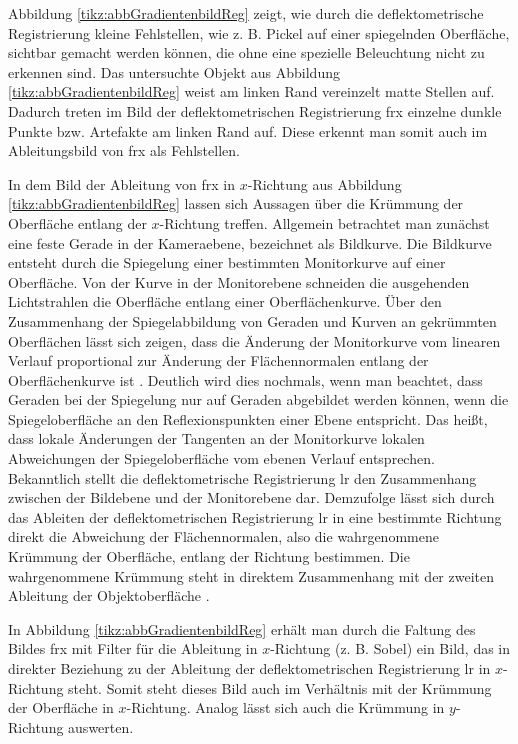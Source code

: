 \noindent
Abbildung \ref{tikz:abbGradientenbildReg} zeigt, wie durch die deflektometrische Registrierung kleine Fehlstellen, wie z. B. Pickel auf einer spiegelnden Oberfläche, sichtbar gemacht werden können, die ohne eine spezielle Beleuchtung nicht zu erkennen sind.
Das untersuchte Objekt aus Abbildung \ref{tikz:abbGradientenbildReg} weist am linken Rand vereinzelt matte Stellen auf.
Dadurch treten im Bild der deflektometrischen Registrierung \acrshort{frx} einzelne dunkle Punkte bzw. Artefakte am linken Rand auf.
Diese erkennt man somit auch im Ableitungsbild von \acrshort{frx} als Fehlstellen.

\p
In dem Bild der Ableitung von \acrshort{frx} in $x$-Richtung aus Abbildung \ref{tikz:abbGradientenbildReg} lassen sich Aussagen über die Krümmung der Oberfläche entlang der $x$-Richtung treffen.
Allgemein betrachtet man zu\-nächst eine feste Gerade in der Kameraebene, bezeichnet als Bildkurve.
Die Bildkurve entsteht durch die Spiegelung einer bestimmten Monitorkurve auf einer Oberfläche.
Von der Kurve in der Monitorebene schneiden die ausgehenden Lichtstrahlen die Oberfläche entlang einer Oberflächenkurve.
Über den Zusammenhang der Spiegelabbildung von Geraden und Kurven an gekrümmten Oberflächen lässt sich zeigen, dass die Änderung der Monitorkurve vom linearen Verlauf proportional zur Änderung der Flächennormalen entlang der Oberflächenkurve ist \cite{kit_werling}.
Deutlich wird dies nochmals, wenn man beachtet, dass Geraden bei der Spiegelung nur auf Geraden abgebildet werden können, wenn die Spiegeloberfläche an den Reflexionspunkten einer Ebene entspricht.
Das heißt, dass lokale Änderungen der Tangenten an der Monitorkurve lokalen Abweichungen der Spiegeloberfläche vom ebenen Verlauf entsprechen.
Bekanntlich stellt die deflektometrische Registrierung \acrshort{lr} den Zusammenhang zwischen der Bildebene und der Monitorebene dar.
Demzufolge lässt sich durch das Ableiten der deflektometrischen Registrierung \acrshort{lr} in eine bestimmte Richtung direkt die Abweichung der Flächennormalen, also die wahrgenommene Krümmung der Oberfläche, entlang der Richtung bestimmen.
Die wahrgenommene Krümmung steht in direktem Zusammenhang mit der zweiten Ableitung der Objektoberfläche \cite{kit_werling}.

\p
In Abbildung \ref{tikz:abbGradientenbildReg} erhält man durch die Faltung des Bildes \acrshort{frx} mit Filter für die Ableitung in $x$-Richtung (z. B. Sobel) ein Bild, das in direkter Beziehung zu der Ableitung der deflektometrischen Registrierung \acrshort{lr} in  $x$-Richtung steht.
Somit steht dieses Bild auch im Verhältnis mit der Krümmung der Oberfläche in $x$-Richtung.
Analog lässt sich auch die Krümmung in $y$-Richtung auswerten.

